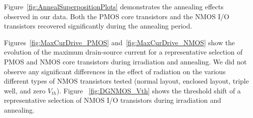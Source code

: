 Figure~\ref{fig:AnnealSuperpositionPlots} demonstrates the annealing effects observed in our data. Both the PMOS core transistors and the NMOS I/O transistors recovered significantly during the annealing period. 

Figures~\ref{fig:MaxCurDrive_PMOS} and~\ref{fig:MaxCurDrive_NMOS} show the evolution of the maximum drain-source current for a representative selection of PMOS and NMOS core transistors during irradiation and annealing.  We did not observe any significant differences in the effect of radiation on the various different types of NMOS transistors tested (normal layout, enclosed layout, triple well, and zero $V_{th}$).
Figure ~\ref{fig:DGNMOS_Vth} shows the threshold shift of a representative selection of NMOS I/O transistors during irradiation and annealing.
